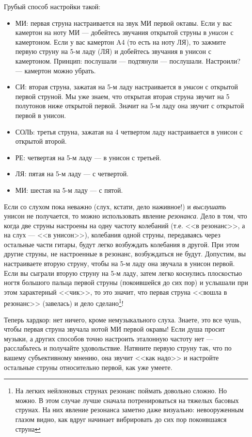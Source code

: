 Грубый способ настройки такой:
\begin{itemize}
    \item МИ: первая струна настраивается на звук МИ первой октавы. Если у вас камертон на ноту МИ --- добейтесь звучания открытой струны в \emph{унисон} с камертоном. Если у вас камертон A4 (то есть на ноту ЛЯ), то зажмите первую струну на 5-м ладу (ЛЯ) и добейтесь звучания в унисон с камертоном. Принцип: послушали --- подтянули --- послушали. Настроили? --- камертон можно убрать.
    \item СИ: вторая струна, зажатая на 5-м ладу настраивается в \emph{унисон} с открытой первой струной. Мы уже знаем, что открытая вторая струна звучит на 5 полутонов ниже открытой первой. Значит на 5-м ладу она звучит с открытой первой в унисон.
    \item СОЛЬ: третья струна, зажатая на 4 четвертом ладу настраивается в унисон с открытой второй.
    \item РЕ: четвертая на 5-м ладу --- в унисон с третьей.
    \item ЛЯ: пятая на 5-м ладу --- с четвертой.
    \item МИ: шестая на 5-м ладу --- с пятой.
\end{itemize}

Если со слухом пока неважно (слух, кстати, дело наживное!) и \emph{выслушать} унисон не получается, то можно использовать явление \emph{резонанса}. Дело в том, что когда две струны настроены на одну частоту колебаний (т.е. <<в резонанс>>, а на слух --- <<в унисон>>), колебания одной струны, передаваясь через остальные части гитары, будут легко возбуждать колебания в другой. При этом другие струны, не настроенные в резонанс, возбуждаться не будут. Допустим, вы настраиваете вторую струну, чтобы на 5-м ладу она звучала в унисон первой. Если вы сыграли вторую струну на 5-м ладу, затем легко коснулись плоскостью ногтя большого пальца первой струны (покоившейся до сих пор) и услышали при этом характерный <<чик>>, то это значит, что первая струна <<вошла в резонанс>> (завелась) и дело сделано\footnote{На легких нейлоновых струнах резонанс поймать довольно сложно. Но можно. В этом случае лучше сначала потренироваться на тяжелых басовых струнах. На них явление резонанса заметно даже визуально: невооруженным глазом видно, как вдруг начинает вибрировать до сих пор покоившаяся струна}!

Теперь хардкор: нет ничего, кроме немузыкального слуха. Знаете, это все чушь, чтобы первая струна звучала нотой МИ первой окравы! Если душа просит музыки, а других способов точно настроить эталонную частоту нет --- расслабьтесь и получайте удовольствие. Натяните первую струну так, что по вашему субъективному мнению, она звучит <<как надо>> и настройте остальные струны относительно первой, как уже умеете.

